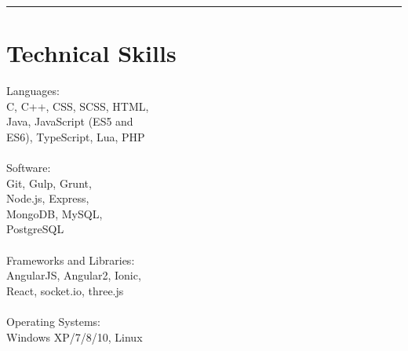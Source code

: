 \noindent\rule{0.9\hsize}{0.4pt}
\section{\normalsize{Technical Skills}}

Languages:\\
C, C++, CSS, SCSS, HTML,\\
Java, JavaScript (ES5 and\\
ES6), TypeScript, Lua, PHP\\
\\
Software:\\
Git, Gulp, Grunt,\\
Node.js, Express,\\
MongoDB, MySQL,\\
PostgreSQL\\
\\
Frameworks and Libraries:\\
AngularJS, Angular2, Ionic,\\
React, socket.io, three.js\\
\\
Operating Systems:\\
Windows XP/7/8/10, Linux\\
